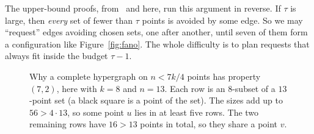 \documentclass[11pt]{amsart}
\theoremstyle{definition}
\theoremstyle{remark}
\begin{document}
The upper-bound proofs, from~\cite{FKW} and here, run this argument in reverse. If $\tau$ is large, then \emph{every} set of fewer than $\tau$ points is avoided by some edge. So we may ``request'' edges avoiding chosen sets, one after another, until seven of them form a configuration like Figure~\ref{fig:fano}. The whole difficulty is to plan requests that always fit inside the budget $\tau-1$.

\begin{figure}[htb]
\centering
{}
\caption{Why a complete hypergraph on $n<7k/4$ points has property $(7,2)$, here with $k=8$ and $n=13$. Each row is an $8$-subset of a $13$-point set (a black square is a point of the set). The sizes add up to $56>4\cdot13$, so some point $u$ lies in at least five rows. The two remaining rows have $16>13$ points in total, so they share a point $v$.}\label{fig:pigeon}
\end{figure}
\end{document}
